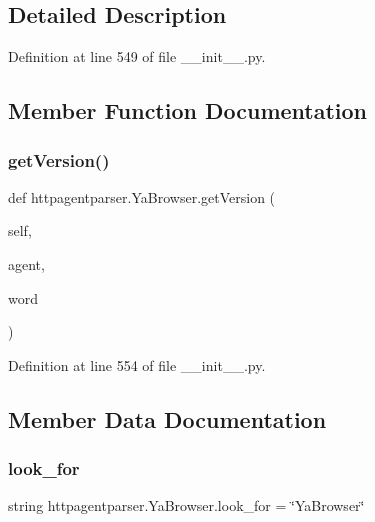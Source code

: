 \subsection{Detailed Description}


Definition at line 549 of file \+\_\+\+\_\+init\+\_\+\+\_\+.\+py.



\subsection{Member Function Documentation}
\hypertarget{classhttpagentparser_1_1_ya_browser_a88154cb34c8119927c26d7635cd75a03}{}\label{classhttpagentparser_1_1_ya_browser_a88154cb34c8119927c26d7635cd75a03} 
\subsubsection{\texorpdfstring{get\+Version()}{getVersion()}}
{\footnotesize\ttfamily def httpagentparser.\+Ya\+Browser.\+get\+Version (\begin{DoxyParamCaption}\item[{}]{self,  }\item[{}]{agent,  }\item[{}]{word }\end{DoxyParamCaption})}



Definition at line 554 of file \+\_\+\+\_\+init\+\_\+\+\_\+.\+py.



\subsection{Member Data Documentation}
\hypertarget{classhttpagentparser_1_1_ya_browser_a5224da4f5a1b9a941c639aa343055b3a}{}\label{classhttpagentparser_1_1_ya_browser_a5224da4f5a1b9a941c639aa343055b3a} 
\subsubsection{\texorpdfstring{look\+\_\+for}{look\_for}}
{\footnotesize\ttfamily string httpagentparser.\+Ya\+Browser.\+look\+\_\+for = \char`\"{}Ya\+Browser\char`\"{}\hspace{0.3cm}{\ttfamily [static]}}



